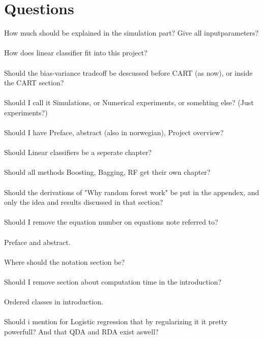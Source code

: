 \section{Questions}
\label{sec:Questions}
How much should be explained in the simulation part? Give all inputparameters?\\
\\
How does linear classifier fit into this project?\\
\\
Should the bias-variance tradeoff be descussed before CART (as now), or inside the CART section?\\
\\
Should I call it Simulations, or Numerical experiments, or somehting else? (Just experiments?)\\
\\
Should I have Preface, abstract (also in norwegian), Project overview?\\
\\
Should Linear classifiers be a seperate chapter? \\
\\
Should all methods Boosting, Bagging, RF get their own chapter?\\
\\
Should the derivations of "Why random forest work" be put in the appendex, and only the idea and results discussed in that section?\\
\\
Should I remove the equation number on equations note referred to?\\
\\
Preface and abstract.\\
\\
Where should the notation section be? \\
\\
Should I remove section about computation time in the introduction? \\
\\
Ordered classes in introduction.\\
\\
Should i mention for Logistic regression that by regularizing it it pretty powerfull? And that QDA and RDA exist aswell?\\
\\
